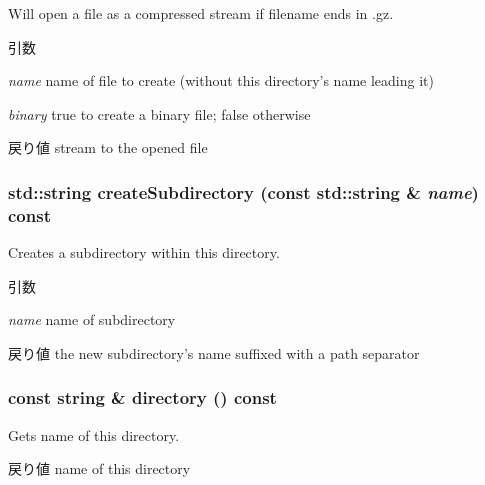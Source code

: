 Will open a file as a compressed stream if filename ends in .gz.


\begin{DoxyParams}{引数}
\item[{\em name}]name of file to create (without this directory's name leading it) \item[{\em binary}]true to create a binary file; false otherwise \end{DoxyParams}
\begin{DoxyReturn}{戻り値}
stream to the opened file 
\end{DoxyReturn}
\hypertarget{classOutputDirectory_ac2ac87b6b1da98eb0f0fdb2ecbc34c6f}{
\subsubsection[{createSubdirectory}]{\setlength{\rightskip}{0pt plus 5cm}std::string createSubdirectory (const std::string \& {\em name}) const}}
\label{classOutputDirectory_ac2ac87b6b1da98eb0f0fdb2ecbc34c6f}
Creates a subdirectory within this directory. 
\begin{DoxyParams}{引数}
\item[{\em name}]name of subdirectory \end{DoxyParams}
\begin{DoxyReturn}{戻り値}
the new subdirectory's name suffixed with a path separator 
\end{DoxyReturn}
\hypertarget{classOutputDirectory_a89b2e59c89cc0aa42fdcdf8a6440656e}{
\subsubsection[{directory}]{\setlength{\rightskip}{0pt plus 5cm}const string \& directory () const}}
\label{classOutputDirectory_a89b2e59c89cc0aa42fdcdf8a6440656e}
Gets name of this directory. \begin{DoxyReturn}{戻り値}
name of this directory 
\end{DoxyReturn}



